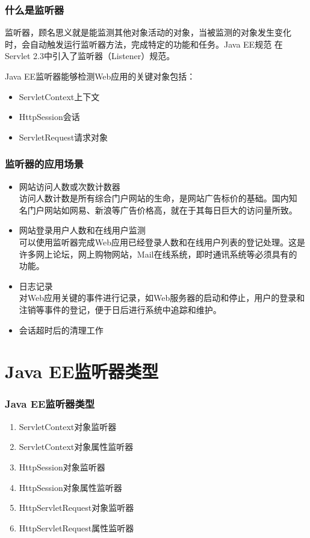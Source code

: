 \begin{frame}
  \frametitle{什么是监听器} 

  \begin{block}{}
    监听器，顾名思义就是能监测其他对象活动的对象，当被监测的对象发生变化
    时，会自动触发运行监听器方法，完成特定的功能和任务。Java EE规范
    在Servlet 2.3中引入了监听器（Listener）规范。
  \end{block}

  Java EE监听器能够检测Web应用的关键对象包括：

  \begin{itemize}
  \item ServletContext上下文
  \item HttpSession会话
  \item ServletRequest请求对象
  \end{itemize}
\end{frame}

\begin{frame}[fragile] %
  \frametitle{监听器的应用场景} 
  \begin{itemize}
  \item {\hei 网站访问人数或次数计数器}\\
    访问人数计数是所有综合门户网站的生命，是网站广告标价的基础。国内知
    名门户网站如网易、新浪等广告价格高，就在于其每日巨大的访问量所致。
  \item {\hei 网站登录用户人数和在线用户监测}\\
    可以使用监听器完成Web应用已经登录人数和在线用户列表的登记处理。这是
    许多网上论坛，网上购物网站，Mail在线系统，即时通讯系统等必须具有的
    功能。
  \item {\hei 日志记录}\\
    对Web应用关键的事件进行记录，如Web服务器的启动和停止，用户的登录和
    注销等事件的登记，便于日后进行系统中追踪和维护。
  \item {\hei 会话超时后的清理工作}
  \end{itemize}
\end{frame}

\section{Java EE监听器类型}

\begin{frame}[fragile] %
  \frametitle{Java EE监听器类型} 

  \begin{enumerate}
  \item ServletContext对象监听器
  \item ServletContext对象属性监听器
  \item HttpSession对象监听器
  \item HttpSession对象属性监听器
  \item HttpServletRequest对象监听器
  \item HttpServletRequest属性监听器
  \end{enumerate}
\end{frame}

